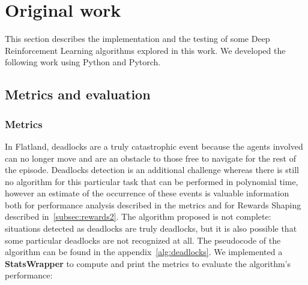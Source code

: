 \documentclass[11pt, a4paper, hidelinks]{report}
\begin{document}
\chapter{Original work}\label{ch:original-work}

This section describes the implementation and the testing of some Deep Reinforcement Learning algorithms explored in this work.
We developed the following work using Python and Pytorch.

\section{Metrics and evaluation}\label{sec:metrics-and-evaluation}

\subsection{Metrics}\label{subsec:metrics}

In Flatland, deadlocks are a truly catastrophic event because the agents involved can no longer move and are an obstacle to those free to navigate for the rest of the episode.
Deadlocks detection is an additional challenge whereas there is still no algorithm for this particular task that can be performed in polynomial time, however an estimate of the occurrence of these events is valuable information both for performance analysis described in the metrics and for Rewards Shaping described in~\ref{subsec:rewards2}.
The algorithm proposed is not complete: situations detected as deadlocks are truly deadlocks, but it is also possible that some particular deadlocks are not recognized at all.
The pseudocode of the algorithm can be found in the appendix~\ref{alg:deadlocks}.
We implemented a \textbf{StatsWrapper} to compute and print the metrics to evaluate the algorithm's performance:
\end{document}
